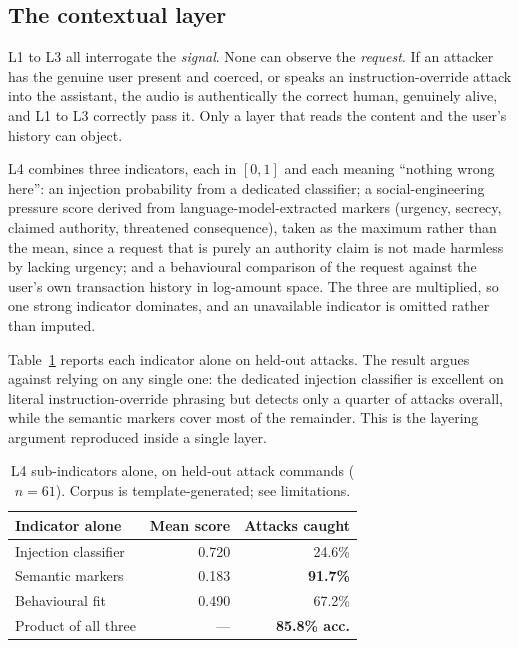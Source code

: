 \documentclass[conference]{IEEEtran}
\begin{document}
\subsection{The contextual layer}

L1 to L3 all interrogate the \emph{signal}. None can observe the
\emph{request}. If an attacker has the genuine user present and coerced, or
speaks an instruction-override attack into the assistant, the audio is
authentically the correct human, genuinely alive, and L1 to L3 correctly pass
it. Only a layer that reads the content and the user's history can object.

L4 combines three indicators, each in $[0,1]$ and each meaning ``nothing wrong
here'': an injection probability from a dedicated classifier; a
social-engineering pressure score derived from language-model-extracted markers
(urgency, secrecy, claimed authority, threatened consequence), taken as the
maximum rather than the mean, since a request that is purely an authority claim
is not made harmless by lacking urgency; and a behavioural comparison of the
request against the user's own transaction history in log-amount space. The
three are multiplied, so one strong indicator dominates, and an unavailable
indicator is omitted rather than imputed.

Table~\ref{tab:l4} reports each indicator alone on held-out attacks. The
result argues against relying on any single one: the dedicated injection
classifier is excellent on literal instruction-override phrasing but detects
only a quarter of attacks overall, while the semantic markers cover most of the
remainder. This is the layering argument reproduced inside a single layer.

\begin{table}[t]
\caption{L4 sub-indicators alone, on held-out attack commands
($n=61$). Corpus is template-generated; see limitations.}
\label{tab:l4}
\centering
\footnotesize
\begin{tabular}{@{}lrr@{}}
\toprule
\textbf{Indicator alone} & \textbf{Mean score} & \textbf{Attacks caught} \\
\midrule
Injection classifier   & 0.720 & 24.6\% \\
Semantic markers       & 0.183 & \textbf{91.7\%} \\
Behavioural fit        & 0.490 & 67.2\% \\
\midrule
Product of all three   & --- & \textbf{85.8\% acc.} \\
\bottomrule
\end{tabular}
\end{table}
\end{document}
